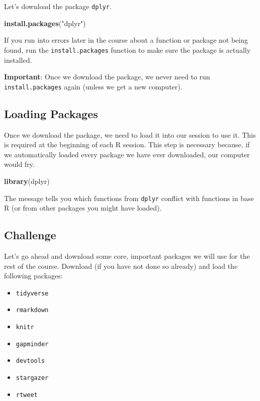 \documentclass[]{book}
\newenvironment{Shaded}{\begin{snugshade}}{\end{snugshade}}
\newcommand{\KeywordTok}[1]{\textcolor[rgb]{0.13,0.29,0.53}{\textbf{#1}}}
\newcommand{\StringTok}[1]{\textcolor[rgb]{0.31,0.60,0.02}{#1}}
\newcommand{\NormalTok}[1]{#1}
\providecommand{\tightlist}{%
  \setlength{\itemsep}{0pt}\setlength{\parskip}{0pt}}
\begin{document}
Let's download the package \texttt{dplyr}.

\begin{Shaded}
\begin{Highlighting}[]
\KeywordTok{install.packages}\NormalTok{(}\StringTok{"dplyr"}\NormalTok{)}
\end{Highlighting}
\end{Shaded}

If you run into errors later in the course about a function or package
not being found, run the \texttt{install.packages} function to make sure
the package is actually installed.

\textbf{Important}: Once we download the package, we never need to run
\texttt{install.packages} again (unless we get a new computer).

\subsection{Loading Packages}\label{loading-packages}

Once we download the package, we need to load it into our session to use
it. This is required at the beginning of each R session. This step is
necessary because, if we automatically loaded every package we have ever
downloaded, our computer would fry.

\begin{Shaded}
\begin{Highlighting}[]
\KeywordTok{library}\NormalTok{(dplyr)}
\end{Highlighting}
\end{Shaded}

The message tells you which functions from \texttt{dplyr} conflict with
functions in base R (or from other packages you might have loaded).

\subsection{Challenge}\label{challenge}

Let's go ahead and download some core, important packages we will use
for the rest of the course. Download (if you have not done so already)
and load the following packages:

\begin{itemize}
\tightlist
\item
  \texttt{tidyverse}
\item
  \texttt{rmarkdown}
\item
  \texttt{knitr}
\item
  \texttt{gapminder}
\item
  \texttt{devtools}
\item
  \texttt{stargazer}
\item
  \texttt{rtweet}
\end{itemize}
\end{document}
